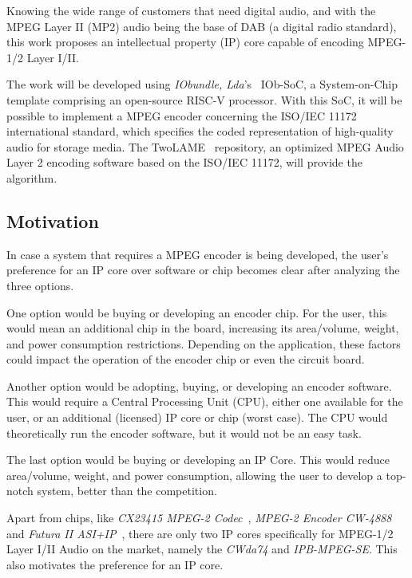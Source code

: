 Knowing the wide range of customers that need digital audio, and with the MPEG Layer II (MP2) audio being the base of DAB (a digital radio standard), this work proposes an intellectual property (IP) core capable of encoding MPEG-1/2 Layer I/II. 

The work will be developed using \textit{IObundle, Lda}'s~\cite{iobundle} IOb-SoC, a System-on-Chip template comprising an open-source RISC-V processor. 
With this SoC, it will be possible to implement a MPEG encoder concerning the ISO/IEC 11172 international standard, which specifies the coded representation of high-quality audio for storage media. The TwoLAME~\cite{twolame} repository, an optimized MPEG Audio Layer 2 encoding software based on the ISO/IEC 11172, will provide the algorithm.

\subsection{Motivation}

In case a system that requires a MPEG encoder is being developed, the user's preference for an IP core over software or chip becomes clear after analyzing the three options.

One option would be buying or developing an encoder chip. For the user, this would mean an additional chip in the board, increasing its area/volume, weight, and power consumption restrictions. Depending on the application, these factors could impact the operation of the encoder chip or even the circuit board.

Another option would be adopting, buying, or developing an encoder software. This would require a Central Processing Unit (CPU), either one available for the user, or an additional (licensed) IP core or chip (worst case). The CPU would theoretically run the encoder software, but it would not be an easy task.

The last option would be buying or developing an IP Core. This would reduce area/volume, weight, and power consumption, allowing the user to develop a top-notch system, better than the competition.

Apart from chips, like \textit{CX23415 MPEG-2 Codec}~\cite{cx23415}, \textit{MPEG-2 Encoder CW-4888}~\cite{cw4888} and \textit{Futura II ASI+IP}~\cite{futura}, there are only two IP cores specifically for MPEG-1/2 Layer I/II Audio on the market, namely the \textit{CWda74} and \textit{IPB-MPEG-SE}. This also motivates the preference for an IP core.

